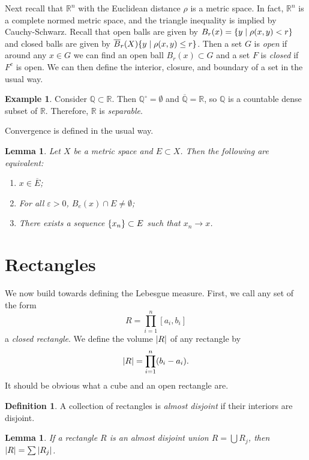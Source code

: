 \documentclass[leqno, openany]{memoir}
\newtheorem{lem}[thm]{Lemma}
\theoremstyle{definition}
\newtheorem{defn}[thm]{Definition}
\newtheorem{exm}[thm]{Example}
\theoremstyle{remark}
\theoremstyle{plain}
\theoremstyle{definition}
\theoremstyle{remark}
\newcommand{\R}{\mathbb{R}}
\newcommand{\Q}{\mathbb{Q}}
\newcommand{\ep}{\varepsilon}
\newcommand{\ol}[1]{\overline{#1}}
\begin{document}
Next recall that $\R^n$ with the Euclidean distance $\rho$ is a metric space. In fact, $\R^n$ is a complete normed metric space, and the triangle inequality is implied by Cauchy-Schwarz. Recall that open balls are given by $B_r(x) = \qty{y \mid \rho(x,y) < r}$ and closed balls are given by $\ol{B}_r(X)\qty{y \mid \rho(x,y) \leq r}$. Then a set $G$ is \textit{open} if around any $x \in G$ we can find an open ball $B_r(x) \subset G$ and a set $F$ is \textit{closed} if $F^c$ is open. We can then define the interior, closure, and boundary of a set in the usual way.

\begin{exm}
    Consider $\Q \subset \R$. Then $\Q^{\circ} = \emptyset$ and $\ol{\Q} = \R$, so $\Q$ is a countable dense subset of $\R$. Therefore, $\R$ is \textit{separable}.
\end{exm}

Convergence is defined in the usual way.
\begin{lem}
    Let $X$ be a metric space and $E \subset X$. Then the following are equivalent:
    \begin{enumerate}
        \item $x \in \ol{E}$;
        \item For all $\ep > 0$, $B_e(x) \cap E \neq \emptyset$;
        \item There exists a sequence $\qty{x_n} \subset E$ such that $x_n \to x$.
    \end{enumerate}
\end{lem}

\section{Rectangles}%
\label{sec:rectangles}

We now build towards defining the Lebesgue measure. First, we call any set of the form
\[ R = \prod_{i=1}^n [a_i,b_i] \]
a \textit{closed rectangle}. We define the volume $\abs{R}$ of any rectangle by
\[ \abs{R} = \prod_{i=1}^n (b_i - a_i). \]
It should be obvious what a cube and an open rectangle are.

\begin{defn}
    A collection of rectangles is \textit{almost disjoint} if their interiors are disjoint.
\end{defn}

\begin{lem}
    If a rectangle $R$ is an almost disjoint union $R = \bigcup R_j$, then $\abs{R} = \sum \abs{R_j}$.
\end{lem}
\end{document}
